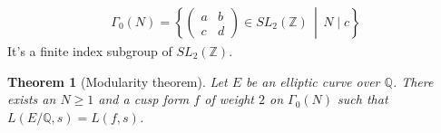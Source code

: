 \documentclass[12pt,a4paper,english]{article}
\theoremstyle{plain}
\newtheorem{thm}{Theorem}[section]
\theoremstyle{definition}
\begin{document}
\begin{align*}
\Gamma_0(N)=\left\lbrace\begin{pmatrix} a & b \\ c & d \end{pmatrix}\in SL_2(\mathbb{Z})\,\middle|\, N\mid c\right\rbrace
\end{align*}
It's a finite index subgroup of $SL_2(\mathbb{Z})$.

\begin{thm}[Modularity theorem]
Let $E$ be an elliptic curve over $\mathbb{Q}$. There exists an $N\geqslant 1$ and a cusp form $f$ of weight $2$ on $\Gamma_0(N)$ such that $L(E/\mathbb{Q}, s) = L(f, s)$.
\end{thm}

\newpage


\end{document}
